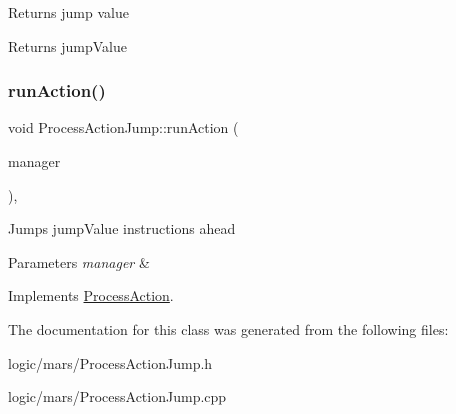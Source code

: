 Returns jump value \begin{DoxyReturn}{Returns}
jump\+Value 
\end{DoxyReturn}
\mbox{\label{classProcessActionJump_a655f264451f08675b094a38fcb540155}} 
\subsubsection{\texorpdfstring{run\+Action()}{runAction()}}
{\footnotesize\ttfamily void Process\+Action\+Jump\+::run\+Action (\begin{DoxyParamCaption}\item[{\hyperlink{classProcessManager}{Process\+Manager} \&}]{manager }\end{DoxyParamCaption})\hspace{0.3cm}{\ttfamily [override]}, {\ttfamily [virtual]}}

Jumps jump\+Value instructions ahead 
\begin{DoxyParams}{Parameters}
{\em manager} & \\
\hline
\end{DoxyParams}


Implements \hyperlink{classProcessAction}{Process\+Action}.



The documentation for this class was generated from the following files\+:\begin{DoxyCompactItemize}
\item 
logic/mars/Process\+Action\+Jump.\+h\item 
logic/mars/Process\+Action\+Jump.\+cpp\end{DoxyCompactItemize}
